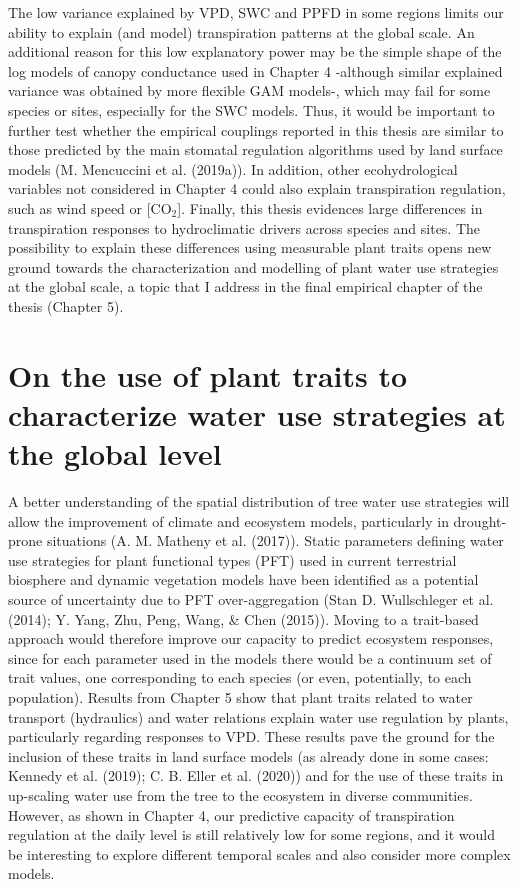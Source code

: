 \documentclass[11pt,twoside]{reedthesis}
\begin{document}
The low variance explained by VPD, SWC and PPFD in some regions limits
our ability to explain (and model) transpiration patterns at the global
scale. An additional reason for this low explanatory power may be the
simple shape of the log models of canopy conductance used in Chapter 4
-although similar explained variance was obtained by more flexible GAM
models-, which may fail for some species or sites, especially for the
SWC models. Thus, it would be important to further test whether the
empirical couplings reported in this thesis are similar to those
predicted by the main stomatal regulation algorithms used by land
surface models (M. Mencuccini et al. (2019a)). In addition, other
ecohydrological variables not considered in Chapter 4 could also explain
transpiration regulation, such as wind speed or {[}\(\text{CO}_2\){]}.
Finally, this thesis evidences large differences in transpiration
responses to hydroclimatic drivers across species and sites. The
possibility to explain these differences using measurable plant traits
opens new ground towards the characterization and modelling of plant
water use strategies at the global scale, a topic that I address in the
final empirical chapter of the thesis (Chapter 5).\par

\section{On the use of plant traits to characterize water use strategies
at the global
level}\label{on-the-use-of-plant-traits-to-characterize-water-use-strategies-at-the-global-level}

A better understanding of the spatial distribution of tree water use
strategies will allow the improvement of climate and ecosystem models,
particularly in drought-prone situations (A. M. Matheny et al. (2017)).
Static parameters defining water use strategies for plant functional
types (PFT) used in current terrestrial biosphere and dynamic vegetation
models have been identified as a potential source of uncertainty due to
PFT over-aggregation (Stan D. Wullschleger et al. (2014); Y. Yang, Zhu,
Peng, Wang, \& Chen (2015)). Moving to a trait-based approach would
therefore improve our capacity to predict ecosystem responses, since for
each parameter used in the models there would be a continuum set of
trait values, one corresponding to each species (or even, potentially,
to each population). Results from Chapter 5 show that plant traits
related to water transport (hydraulics) and water relations explain
water use regulation by plants, particularly regarding responses to VPD.
These results pave the ground for the inclusion of these traits in land
surface models (as already done in some cases: Kennedy et al. (2019); C.
B. Eller et al. (2020)) and for the use of these traits in up-scaling
water use from the tree to the ecosystem in diverse communities.
However, as shown in Chapter 4, our predictive capacity of transpiration
regulation at the daily level is still relatively low for some regions,
and it would be interesting to explore different temporal scales and
also consider more complex models.\par
\end{document}
